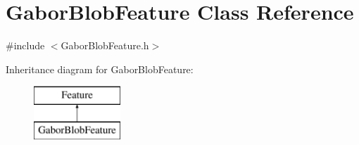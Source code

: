 \hypertarget{class_gabor_blob_feature}{\section{Gabor\+Blob\+Feature Class Reference}
\label{class_gabor_blob_feature}
}


{\ttfamily \#include $<$Gabor\+Blob\+Feature.\+h$>$}

Inheritance diagram for Gabor\+Blob\+Feature\+:\begin{figure}[H]
\begin{center}
\leavevmode
\includegraphics[height=2.000000cm]{class_gabor_blob_feature}
\end{center}
\end{figure}
